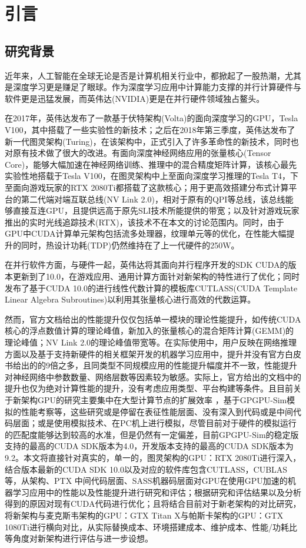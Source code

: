 \newpage
\section{引言}
\setcounter{table}{0}
\setcounter{figure}{0}
\subsection{研究背景}
\par 近年来，人工智能在全球无论是否是计算机相关行业中，都掀起了一股热潮，尤其是深度学习更是赚足了眼球。作为深度学习应用中计算能力支撑的并行计算硬件与软件更是迅猛发展，而英伟达(NVIDIA)更是在并行硬件领域独占鳌头。
\par 在2017年，英伟达发布了一款基于伏特架构(Volta)的面向深度学习的GPU，Tesla V100\cite{TESLAV100}，其中搭载了一些实验性的新技术；之后在2018年第三季度，英伟达发布了新一代图灵架构(Turing)，在该架构中，正式引入了许多革命性的新技术，同时也对原有技术做了很大的改进。有面向深度神经网络应用的张量核心(Tensor Core)\cite{TENSORCORE}，能够大幅加速在神经网络训练、推理中的混合精度矩阵计算，该核心最先实验性地搭载于Tesla V100，在图灵架构中上至面向深度学习推理的Tesla T4，下至面向游戏玩家的RTX 2080Ti都搭载了这款核心；用于更高效搭建分布式计算平台的第二代端对端互联总线(NV Link 2.0)\cite{NVLINK2}，相对于原有的QPI等总线，该总线能够直接互连GPU，且提供远高于原先SLI技术所能提供的带宽；以及针对游戏玩家推出的实时光线追踪技术(RTX)，该技术不在本文的讨论范围内。同时，由于GPU中CUDA计算单元架构包括流多处理器，纹理单元等的优化，在性能大幅提升的同时，热设计功耗(TDP)仍然维持在了上一代硬件的250W。
\par 在并行软件方面，与硬件一起，英伟达将其面向并行程序开发的SDK CUDA的版本更新到了10.0，在游戏应用、通用计算方面针对新架构的特性进行了优化；同时发布了基于CUDA 10.0的进行线性代数计算的模板库CUTLASS(CUDA Template Linear Algebra Subroutines)\cite{CUTLASS}以利用其张量核心进行高效的代数运算。
\par 然而，官方文档给出的性能提升仅仅包括单一模块的理论性能提升，如传统CUDA核心的浮点数值计算的理论峰值，新加入的张量核心的混合矩阵计算(GEMM)的理论峰值；NV Link 2.0的理论峰值带宽等。在实际使用中，用户反映在网络推理方面以及基于支持新硬件的相关框架开发的机器学习应用中，提升并没有官方白皮书给出的的9倍之多\cite{VOLTAWHITEPAPER}，且同类型不同规模应用的性能提升幅度并不一致，性能提升对神经网络中参数数量、网络层数等因素较为敏感。实际上，官方给出的文档中的提升也仅为绝对计算性能的提升，没有考虑应用类型、平台构建等条件。且目前关于新架构GPU的研究主要集中在大型计算节点的扩展效率 \cite{EXASCLEDL}，基于GPGPU-Sim模拟的性能考察等\cite{MODELING}，这些研究或是停留在表征性能层面、没有深入到代码或是中间代码层面；或是使用模拟技术、在PC机上进行模拟，尽管目前对于硬件的模拟运行的匹配度能够达到较高的水准，但是仍然有一定偏差，目前GPGPU-Sim的稳定版支持的最高的CUDA SDK版本为4.0，开发版本支持的最高的CUDA SDK版本为9.2。本文将直接针对真实的，单一的，图灵架构的GPU：RTX 2080Ti进行深入，结合版本最新的CUDA SDK 10.0以及对应的软件库包含CUTLASS，CUBLAS等，从架构、PTX 中间代码层面、SASS机器码层面对GPU在使用GPU加速的机器学习应用中的性能以及性能提升进行研究和评估；根据研究和评估结果以及分析得到的原因对现有CUDA代码进行优化；且将结合目前对于新老架构的对比研究\cite{GRAVITATIONAL}，将新架构与麦克斯韦架构的GPU：GTX Titan X与帕斯卡架构的GPU：GTX 1080Ti进行横向对比，从实际替换成本、环境搭建成本、维护成本、性能/功耗比等角度对新架构进行评估与进一步设想。
